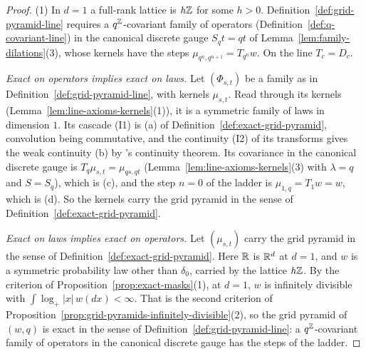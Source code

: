 \begin{proof}
\leanok
(1) In $d = 1$ a full-rank lattice is $h\mathbb{Z}$ for some $h > 0$. Definition~\ref{def:grid-pyramid-line}
requires a $q^{\mathbb{Z}}$-covariant family of operators (Definition~\ref{def:q-covariant-line}) in the
canonical discrete gauge $S_qt = qt$ of Lemma~\ref{lem:family-dilations}(3), whose kernels have the
steps $\mu_{q^n,q^{n+1}} = T_{q^n}w$. On the line $T_c = D_c$.

\emph{Exact on operators implies exact on laws.} Let $(\Phi_{s,t})$ be a family as in
Definition~\ref{def:grid-pyramid-line}, with kernels $\mu_{s,t}$. Read through its kernels
(Lemma~\ref{lem:line-axioms-kernels}(1)), it is a symmetric family of laws in dimension $1$. Its
cascade (I1) is (a) of Definition~\ref{def:exact-grid-pyramid}, convolution being commutative, and
the continuity (I2) of its transforms gives the weak continuity (b) by \Levy's continuity theorem.
Its covariance in the canonical discrete gauge is $T_q\mu_{s,t} = \mu_{qs,qt}$
(Lemma~\ref{lem:line-axioms-kernels}(3) with $\lambda = q$ and $S = S_q$), which is (c), and the
step $n = 0$ of the ladder is $\mu_{1,q} = T_1w = w$, which is (d). So the kernels carry the grid
pyramid in the sense of Definition~\ref{def:exact-grid-pyramid}.

\emph{Exact on laws implies exact on operators.} Let $(\mu_{s,t})$ carry the grid pyramid in the
sense of Definition~\ref{def:exact-grid-pyramid}. Here $\mathbb{R}$ is $\mathbb{R}^d$ at $d = 1$, and $w$ is a
symmetric probability law other than $\delta_0$, carried by the lattice $h\mathbb{Z}$. By the criterion
of Proposition~\ref{prop:exact-masks}(1), at $d = 1$, $w$ is infinitely divisible with
$\int\log_+|x|\,w(dx) < \infty$. That is the second criterion of
Proposition~\ref{prop:grid-pyramids-infinitely-divisible}(2), so the grid pyramid of $(w, q)$ is
exact in the sense of Definition~\ref{def:grid-pyramid-line}: a $q^{\mathbb{Z}}$-covariant family of
operators in the canonical discrete gauge has the steps of the ladder.


\end{proof}
